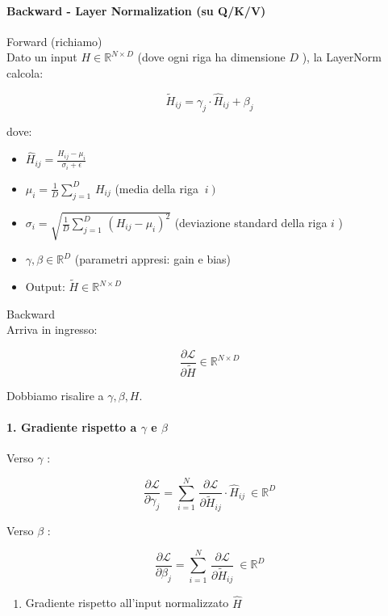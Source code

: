 \documentclass[
  11pt,
]{article}
\begin{document}
\paragraph{Backward - Layer Normalization (su Q/K/V)}
Forward (richiamo)\\
Dato un input \(H \in \mathbb{R}^{N \times D}\) (dove ogni riga ha
dimensione \(D\) ), la LayerNorm calcola:

\[{\widetilde{H}}_{ij} = \gamma_{j} \cdot {\widehat{H}}_{ij} + \beta_{j}\]

dove:

\begin{itemize}
\item
  \({\widehat{H}}_{ij} = \frac{H_{ij} - \mu_{i}}{\sigma_{i} + \epsilon}\)
\item
  \(\mu_{i} = \frac{1}{D}\sum_{j = 1}^{D}\, H_{ij}\) (media
  della riga \(\left. \ i \right)\)
\item
  \(\sigma_{i} = \sqrt{\frac{1}{D}\sum_{j = 1}^{D}\,\left( H_{ij} - \mu_{i} \right)^{2}}\)
  (deviazione standard della riga \(i\) )
\item
  \(\gamma,\beta \in \mathbb{R}^{D}\) (parametri appresi: gain e bias)
\item
  Output: \(\widetilde{H} \in \mathbb{R}^{N \times D}\)
\end{itemize}

Backward\\
Arriva in ingresso:

\[\frac{\partial\mathcal{L}}{\partial\widetilde{H}} \in \mathbb{R}^{N \times D}\]

Dobbiamo risalire a \(\gamma,\beta,H\).

\paragraph{1. Gradiente rispetto a $\gamma$ e $\beta$}

Verso \(\gamma\) :

\[\frac{\partial\mathcal{L}}{\partial\gamma_{j}} = \sum_{i = 1}^{N}\,\frac{\partial\mathcal{L}}{\partial{\widetilde{H}}_{ij}} \cdot {\widehat{H}}_{ij}\  \in \mathbb{R}^{D}\]

Verso \(\beta\) :

\[\frac{\partial\mathcal{L}}{\partial\beta_{j}} = \sum_{i = 1}^{N}\,\frac{\partial\mathcal{L}}{\partial{\widetilde{H}}_{ij}}\  \in \mathbb{R}^{D}\]

\begin{enumerate}
\def\labelenumi{\arabic{enumi}.}
\setcounter{enumi}{1}
\item
  Gradiente rispetto all'input normalizzato
  \(\widehat{H}\)
\end{enumerate}
\end{document}
